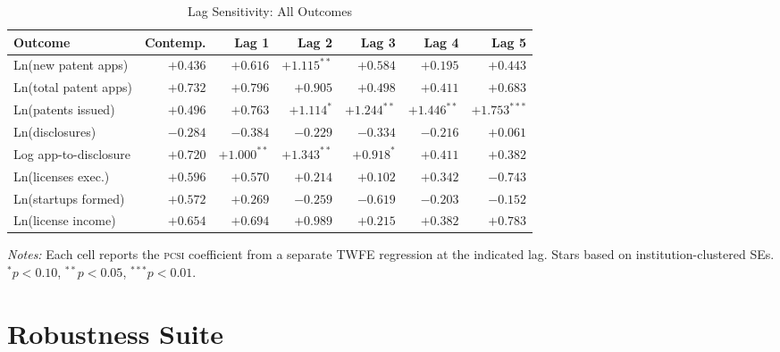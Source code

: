 \documentclass[12pt]{article}
\newcommand{\PCSI}{\textsc{pcsi}}
\begin{document}
\begin{table}[htbp]
\centering
\caption{Lag Sensitivity: All Outcomes}
\label{tab:b3}
\begin{threeparttable}
\begin{tabular}{lrrrrrr}
\toprule
Outcome & Contemp. & Lag 1 & Lag 2 & Lag 3 & Lag 4 & Lag 5 \\
\midrule
Ln(new patent apps) & $+0.436$ & $+0.616$ & $+1.115^{**}$ & $+0.584$ & $+0.195$ & $+0.443$ \\
Ln(total patent apps) & $+0.732$ & $+0.796$ & $+0.905$ & $+0.498$ & $+0.411$ & $+0.683$ \\
Ln(patents issued) & $+0.496$ & $+0.763$ & $+1.114^{*}$ & $+1.244^{**}$ & $+1.446^{**}$ & $+1.753^{***}$ \\
Ln(disclosures) & $-0.284$ & $-0.384$ & $-0.229$ & $-0.334$ & $-0.216$ & $+0.061$ \\
Log app-to-disclosure & $+0.720$ & $+1.000^{**}$ & $+1.343^{**}$ & $+0.918^{*}$ & $+0.411$ & $+0.382$ \\
Ln(licenses exec.) & $+0.596$ & $+0.570$ & $+0.214$ & $+0.102$ & $+0.342$ & $-0.743$ \\
Ln(startups formed) & $+0.572$ & $+0.269$ & $-0.259$ & $-0.619$ & $-0.203$ & $-0.152$ \\
Ln(license income) & $+0.654$ & $+0.694$ & $+0.989$ & $+0.215$ & $+0.382$ & $+0.783$ \\
\bottomrule
\end{tabular}
\begin{tablenotes}
\small
\item \textit{Notes:} Each cell reports the \PCSI{} coefficient from a separate TWFE
regression at the indicated lag. Stars based on institution-clustered SEs.
$^*p<0.10$, $^{**}p<0.05$, $^{***}p<0.01$.
\end{tablenotes}
\end{threeparttable}
\end{table}

\section{Robustness Suite}
\label{app:robust}
\end{document}
